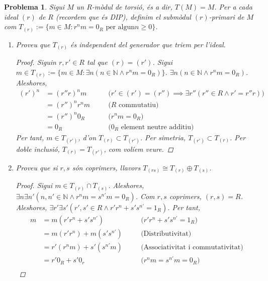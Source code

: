 \documentclass[compress]{article}
\newtheorem{problema}{Problema}
\theoremstyle{definition}
\begin{document}
\begin{problema}
    Sigui $M$ un $R$-mòdul de torsió, és a dir, $T(M)=M$. Per a cada ideal $(r)$ de $R$ (recordem que és DIP), definim el submòdul $(r)$-primari de $M$ com $T_{(r)}:=\{m\in M:r^{n}m=0_{R}\textrm{ per algun}n\geq0\}$.
    \begin{enumerate}
        \item Proveu que $T_{(r)}$ és independent del generador que triem per l'ideal.
        \begin{proof}
            Siguin $r,r'\in R$ tal que $(r)=(r')$. Sigui $m\in T_{(r)}:=\{m\in M:\exists n(n\in\mathbb{N}\land r^{n}m=0_{R})\}$. $\exists n(n\in\mathbb{N}\land r^{n}m=0_{R})$. Aleshores,
            \begin{align*}
                (r')^{n}
                &=(r''r)^{n}m
                &\quad&\textrm{($r'\in(r')=(r'')\implies\exists r''(r''\in R\land r'=r''r)$)}\\
                &=(r'')^{n}r^{n}m
                &\quad&\textrm{($R$ commutatiu)}\\
                &=(r'')^{n}0_{R}
                &\quad&\textrm{($r^{n}m=0_{R}$)}\\
                &=0_{R}
                &\quad&\textrm{($0_{R}$ element neutre additiu)}
            \end{align*}
            Per tant, $m\in T_{(r')}$, d'on $T_{(r)}\subset T_{(r')}$. Per simetria, $T_{(r')}\subset T_{(r)}$. Per doble inclusió, $T_{(r)}=T_{(r')}$, com volíem veure.
        \end{proof}
        \item Proveu que si $r,s$ són coprimers, llavors $T_{(rs)}\cong T_{(r)}\oplus T_{(s)}$.
        \begin{proof}
            Sigui $m\in T_{(r)}\cap T_{(s)}$. Aleshores, $\exists n\exists n'(n,n'\in\mathbb{N}\land r^{n}m=s^{n'}m=0_{R})$. Com $r,s$ coprimers, $(r,s)=R$. Aleshores, $\exists r'\exists s'(r',s'\in R\land r'r^{n}+s's^{n'}=1_{R})$. Per tant,
            \begin{align*}
                m
                &=m(r'r^{n}+s's^{n'})
                &\quad&\textrm{($r'r^{n}+s's^{n'}=1_{R}$)}\\
                &=m(r'r^{n})+m(s's^{n'})
                &\quad&\textrm{(Distributivitat)}\\
                &=r'(r^{n}m)+s'(s^{n'}m)
                &\quad&\textrm{(Associativitat i commutativitat)}\\
                &=r'0_{R}+s'0_{r}
                &\quad&\textrm{($r^{n}m=s^{n'}m=0_{R}$)}\\

\end{align*}
\end{proof}
\end{enumerate}
\end{problema}
\end{document}
